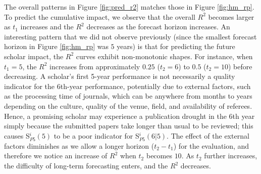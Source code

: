 The overall patterns in Figure \ref{fig:pred_r2} matches those in Figure \ref{fig:hm_rp}. To predict the cumulative impact, we observe that the overall $R^2$ becomes larger as $t_1$ increases and the $R^2$ decreases as the forecast horizon increases. An interesting pattern that we did not observe previously (since the smallest forecast horizon in Figure \ref{fig:hm_rp} was $5$ years) is that for predicting the future scholar impact, the $R^2$ curves exhibit non-monotonic shapes. For instance, when $t_1=5$, the $R^2$ increases from approximately $0.25$ ($t_2=6$) to $0.5$ ($t_2=10$) before decreasing. A scholar's first 5-year performance is not necessarily a quality indicator for the 6th-year performance, potentially due to external factors, such as the processing time of journals, which can be anywhere from months to years depending on the culture, quality of the venue, field, and availability of referees. Hence, a promising scholar may experience a publication drought in the 6th year simply because the submitted papers take longer than usual to be reviewed; this causes S$_{P5}^{i}(5)$ to be a poor indicator for S$_{P5}^{i}(6|5)$. The effect of the external factors diminishes as we allow a longer horizon ($t_2-t_1$) for the evaluation, and therefore we notice an increase of $R^2$ when $t_2$ becomes $10$. As $t_2$ further increases, the difficulty of long-term forecasting enters, and the $R^2$ decreases.





